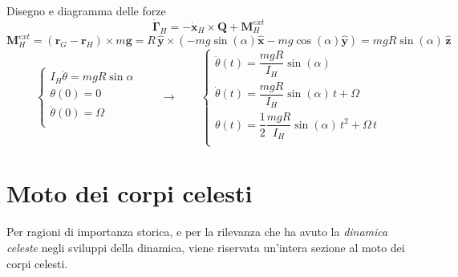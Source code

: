 \begin{example}
    {\color{red} Disegno e diagramma delle forze}
    \begin{equation}
        \dot{\mathbf{\Gamma}}_H = - \dot{\mathbf{x}}_H \times \mathbf{Q} + \mathbf{M}_H^{ext}
    \end{equation}
    \begin{equation}
        \mathbf{M}_H^{ext} = (\mathbf{r}_G - \mathbf{r}_H) \times m \mathbf{g} = R \, \mathbf{\hat{y}} \times (-m g \sin(\alpha) \mathbf{\hat{x}} - m g \cos(\alpha) \mathbf{\hat{y}}) = m g R \sin (\alpha) \, \mathbf{\hat{z}}
    \end{equation}
    \begin{equation}
        \begin{cases}
            I_H \ddot{\theta} = m g R \sin \alpha \\
            \theta(0) = 0 \\
            \dot{\theta}(0) = \Omega \\
        \end{cases}
        \qquad \rightarrow \qquad
        \begin{cases}
            \ddot{\theta}(t) = \dfrac{ m g R}{I_H} \sin (\alpha) \\
            \dot{ \theta}(t) = \dfrac{ m g R}{I_H} \sin (\alpha) \, t + \Omega \\
                  \theta (t) = \dfrac{1}{2} \dfrac{ m g R}{I_H} \sin(\alpha) \, t^2 + \Omega \, t \\
        \end{cases}
    \end{equation}
\end{example}

\begin{example}
\end{example}

\section{Moto dei corpi celesti}
Per ragioni di importanza storica, e per la rilevanza che ha avuto la \textit{dinamica celeste} negli sviluppi della dinamica, viene riservata un'intera sezione al moto dei corpi celesti.


